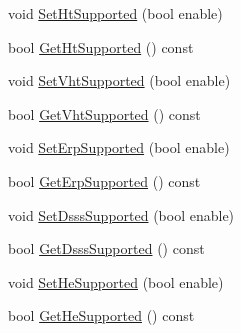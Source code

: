 \begin{DoxyCompactItemize}
\item 
void \hyperlink{classns3_1_1RegularWifiMac_a2b342d2ad0898df9ff0ade65ff39a8c1}{Set\+Ht\+Supported} (bool enable)
\item 
bool \hyperlink{classns3_1_1RegularWifiMac_a533990b906e4fd7b6852e6d124701eb2}{Get\+Ht\+Supported} () const 
\item 
void \hyperlink{classns3_1_1RegularWifiMac_a8f007964ef13ead0c2ee5916eba1966b}{Set\+Vht\+Supported} (bool enable)
\item 
bool \hyperlink{classns3_1_1RegularWifiMac_afc1f3e8ba1d594c0a8716f8471e9da7a}{Get\+Vht\+Supported} () const 
\item 
void \hyperlink{classns3_1_1RegularWifiMac_a61126017f4b5902c91947d4fbfe3f007}{Set\+Erp\+Supported} (bool enable)
\item 
bool \hyperlink{classns3_1_1RegularWifiMac_af51bd4fccf7d20f76910469533593d56}{Get\+Erp\+Supported} () const 
\item 
void \hyperlink{classns3_1_1RegularWifiMac_ac704c4df1771a9e7c0f9ff3bb72ca6fe}{Set\+Dsss\+Supported} (bool enable)
\item 
bool \hyperlink{classns3_1_1RegularWifiMac_a77099405269717e19991a3d049a40240}{Get\+Dsss\+Supported} () const 
\item 
void \hyperlink{classns3_1_1RegularWifiMac_a74075dc0566e812e623ad5a6a05cfe9b}{Set\+He\+Supported} (bool enable)
\item 
bool \hyperlink{classns3_1_1RegularWifiMac_a8c3bcca7041c4dc4c6d8b4651549ad98}{Get\+He\+Supported} () const 
\end{DoxyCompactItemize}
